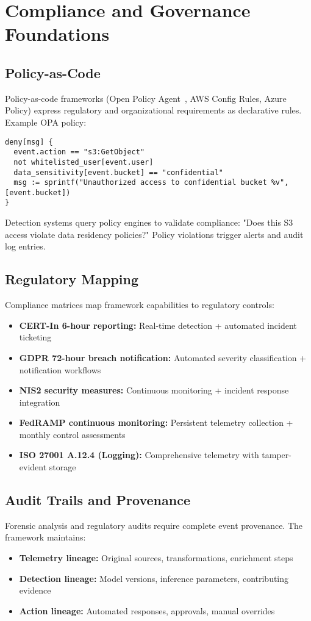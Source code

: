 \section{Compliance and Governance Foundations}\label{sec:theory-compliance}
\subsection{Policy-as-Code}
Policy-as-code frameworks (Open Policy Agent~\cite{openpolicyagent2023}, AWS Config Rules, Azure Policy) express regulatory and organizational requirements as declarative rules. Example OPA policy:

\begin{verbatim}
deny[msg] {
  event.action == "s3:GetObject"
  not whitelisted_user[event.user]
  data_sensitivity[event.bucket] == "confidential"
  msg := sprintf("Unauthorized access to confidential bucket %v", [event.bucket])
}
\end{verbatim}

Detection systems query policy engines to validate compliance: "Does this S3 access violate data residency policies?" Policy violations trigger alerts and audit log entries.

\subsection{Regulatory Mapping}
Compliance matrices map framework capabilities to regulatory controls:
\begin{itemize}
    \item \textbf{CERT-In 6-hour reporting:} Real-time detection + automated incident ticketing
    \item \textbf{GDPR 72-hour breach notification:} Automated severity classification + notification workflows
    \item \textbf{NIS2 security measures:} Continuous monitoring + incident response integration
    \item \textbf{FedRAMP continuous monitoring:} Persistent telemetry collection + monthly control assessments
    \item \textbf{ISO 27001 A.12.4 (Logging):} Comprehensive telemetry with tamper-evident storage
\end{itemize}

\subsection{Audit Trails and Provenance}
Forensic analysis and regulatory audits require complete event provenance. The framework maintains:
\begin{itemize}
    \item \textbf{Telemetry lineage:} Original sources, transformations, enrichment steps
    \item \textbf{Detection lineage:} Model versions, inference parameters, contributing evidence
    \item \textbf{Action lineage:} Automated responses, approvals, manual overrides
\end{itemize}

